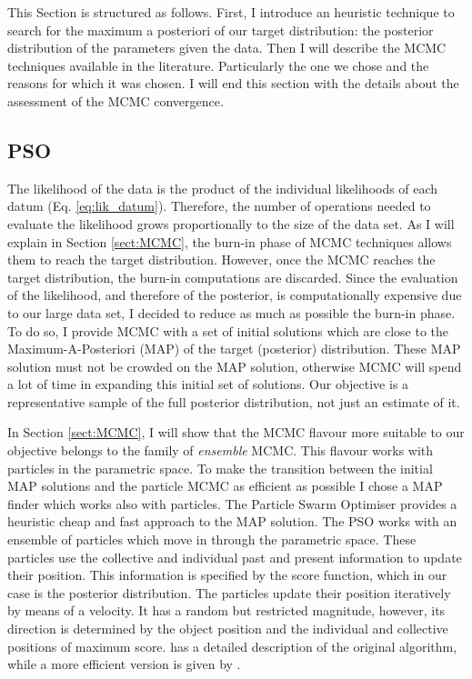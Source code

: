 This Section is structured as follows. First, I introduce an heuristic technique to search for the maximum a posteriori of our target distribution: the posterior distribution of the parameters given the data. Then I will describe the MCMC techniques available in the literature. Particularly the one we chose and the reasons for which it was chosen. I will end this section with the details about the assessment of the MCMC convergence.

\subsection{PSO}

The likelihood of the data is the product of the individual likelihoods of each datum (Eq. \ref{eq:lik_datum}). Therefore, the number of operations needed to evaluate the likelihood grows proportionally to the size of the data set. As I will explain in Section \ref{sect:MCMC}, the burn-in phase of MCMC techniques allows them to reach the target distribution. However, once the MCMC reaches the target distribution, the burn-in computations are discarded. Since the evaluation of the likelihood, and therefore of the posterior, is computationally expensive due to our large data set, I decided to reduce as much as possible the burn-in phase. To do so, I provide MCMC with a set of initial solutions which are close to the Maximum-A-Posteriori (MAP) of the target (posterior) distribution. These MAP solution must not be crowded on the MAP solution, otherwise MCMC will spend a lot of time in expanding this initial set of solutions.  Our objective is a representative sample of the full posterior distribution, not just an estimate of it.

In Section \ref{sect:MCMC}, I will show that the MCMC flavour more suitable to our objective belongs to the family of \emph{ensemble} MCMC. This flavour works with particles in the parametric space. To make the transition between the initial MAP solutions and the particle MCMC as efficient as possible I chose a MAP finder which works also with particles. The Particle Swarm Optimiser \cite[PSO,][]{Kennedy1995} provides a heuristic cheap and fast approach to the MAP solution. The PSO works with an ensemble of particles which move in through the parametric space. These particles use the collective and individual past and present information to update their position. This information is specified by the score function, which in our case is the posterior distribution. The particles update their position iteratively by means of a velocity. It has a random but restricted magnitude, however, its direction is determined by the object position and the individual and collective positions of maximum score. \citet{Kennedy1995} has a detailed description of the original algorithm, while a more efficient version is given by \citep{Clerc2002}.

